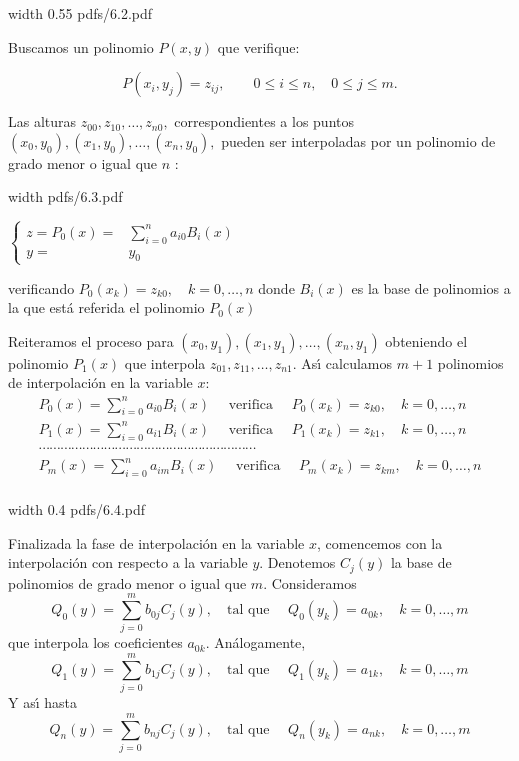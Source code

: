 \documentclass[twoside]{report}
\newcommand{\colocapdf}[2]{\quad\pdfimage width #2 {pdfs/#1.pdf}}
\begin{document}
\begin{center}
\colocapdf{6.2}{0.55\textwidth}
\end{center}

Buscamos un polinomio $P(x,y)$ que verifique:

$$P(x_i,y_j)=z_{ij},\quad \quad 0\leq i\leq n,\quad 0\leq j\leq
m.$$

Las alturas $z_{00},z_{10},\ldots,z_{n0},$ correspondientes a los puntos $(x_0,y_0),(x_1,y_0),\ldots,(x_n,y_0),$ pueden ser interpoladas por un polinomio de grado menor o igual que $n$ :

\begin{minipage}{.35\textwidth}\colocapdf{6.3}{\textwidth}
\end{minipage} \quad \quad \quad
\begin{minipage}{.4\textwidth} $\left\{ \begin{array}{rl}
z=P_0(x)=&\sum_{i=0}^n a_{i0} B_i(x)\\
y=&y_0 \end{array} \right.$
\end{minipage}

verificando $P_0(x_k)=z_{k0}, \quad k=0,\ldots,n$ donde $B_i(x)$ es la base de polinomios a la que est\'{a} referida el polinomio $P_0(x)$

Reiteramos el proceso para $(x_0,y_1),(x_1,y_1),\ldots,(x_n,y_1)$ obteniendo el polinomio $P_1(x)$ que interpola $z_{01},z_{11},\ldots,z_{n1}.$ As\'{\i} calculamos $m+1$ polinomios de interpolaci\'{o}n en la variable $x$:
$$\begin{array}{c}
P_0(x)=\sum_{i=0}^n a_{i0} B_i(x) \quad \mbox{ verifica } \quad
P_0(x_k)=z_{k0}, \quad k=0,\ldots,n \\
P_1(x)=\sum_{i=0}^n a_{i1} B_i(x) \quad \mbox{ verifica } \quad
P_1(x_k)=z_{k1}, \quad k=0,\ldots,n \\
\cdots \cdots \cdots \cdots \cdots \cdots \cdots \cdots \cdots \cdots \cdots \cdots \cdots \cdots \cdots \cdots \cdots \cdots \cdots \cdots\\
P_m(x)=\sum_{i=0}^n a_{im} B_i(x) \quad \mbox{ verifica } \quad
P_m(x_k)=z_{km}, \quad k=0,\ldots,n \\
\end{array}$$
\begin{center}
\colocapdf{6.4}{0.4\textwidth}
\end{center}

Finalizada la fase de interpolaci\'{o}n en la variable $x$, comencemos con la interpolaci\'{o}n con respecto a la variable $y$. Denotemos $C_j(y)$ la base de polinomios de grado menor o igual que $m$. Consideramos
$$Q_0(y)=\sum_{j=0}^m b_{0j}C_j(y),\quad  \mbox{tal que }\quad Q_0(y_k)=a_{0k},\quad k=0,\ldots,m$$
que interpola los coeficientes $a_{0k}$. An\'{a}logamente,
$$Q_1(y)=\sum_{j=0}^m b_{1j}C_j(y),\quad \mbox{tal que }\quad Q_1(y_k)=a_{1k},\quad k=0,\ldots,m$$
Y as\'{\i} hasta
$$Q_n(y)=\sum_{j=0}^m b_{nj}C_j(y),\quad \mbox{tal que }\quad
    Q_n(y_k)=a_{nk},\quad k=0,\ldots,m$$
\end{document}
